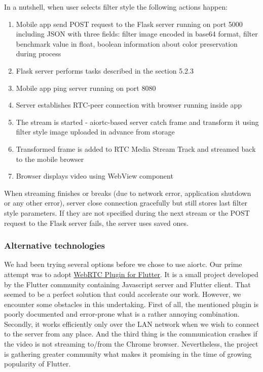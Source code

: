 \documentclass[../Main.tex]{subfiles}
\begin{document}
    In a nutshell, when user selects filter style the following actions happen:
    \begin{enumerate}
    \item Mobile app send POST request to the Flask server running on port 5000 including JSON with three fields: filter image encoded in base64 format, filter benchmark value in float, boolean information about color preservation during process 
    \item Flask server performs tasks described in the section 5.2.3
    \item Mobile app ping server running on port 8080
    \item Server establishes RTC-peer connection with browser running inside app
    \item The stream is started - aiortc-based server catch frame and transform it using filter style image uploaded in advance from storage
    \item Transformed frame is added to RTC Media Stream Track and streamed back to the mobile browser
    \item Browser displays video using WebView component 
    \end{enumerate}
    
    When streaming finishes or breaks (due to network error, application shutdown or any other error), server close connection gracefully but still stores last filter style parameters. If they are not specified during the next stream or the POST request to the Flask server fails, the server uses saved ones. 
    
    \subsubsection{Alternative technologies}
    We had been trying several options before we chose to use aiortc. Our prime attempt was to adopt \href{https://github.com/cloudwebrtc/flutter-webrtc}{WebRTC Plugin for Flutter}. It is a small project developed by the Flutter community containing Javascript server and Flutter client. That seemed to be a perfect solution that could accelerate our work.
    However, we encounter some obstacles in this undertaking. First of all, the mentioned plugin is poorly documented and error-prone what is a rather annoying combination. Secondly, it works efficiently only over the LAN network when we wish to connect to the server from any place. And the third thing is the communication crashes if the video is not streaming to/from the Chrome browser. Nevertheless, the project is gathering greater community what makes it promising in the time of growing popularity of Flutter.
\end{document}
